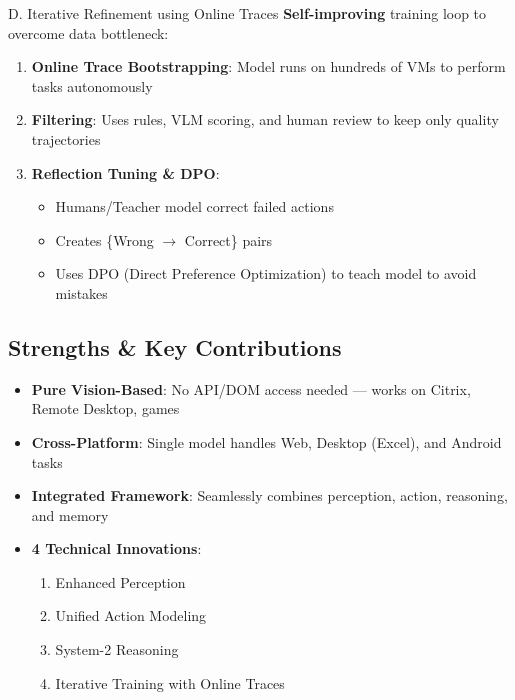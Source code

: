 \begin{frame}{D. Iterative Refinement using Online Traces}
  \textbf{Self-improving} training loop to overcome data bottleneck:
  \begin{enumerate}
    \item \textbf{Online Trace Bootstrapping}: Model runs on hundreds of VMs to perform tasks autonomously
    \item \textbf{Filtering}: Uses rules, VLM scoring, and human review to keep only quality trajectories
    \item \textbf{Reflection Tuning \& DPO}:
      \begin{itemize}
        \item Humans/Teacher model correct failed actions
        \item Creates \{Wrong $\rightarrow$ Correct\} pairs
        \item Uses DPO (Direct Preference Optimization) to teach model to avoid mistakes
      \end{itemize}
  \end{enumerate}
\end{frame}

\subsection{Strengths \& Key Contributions}
\begin{frame}{\insertsubsection}
  \begin{itemize}
    \item \textbf{Pure Vision-Based}: No API/DOM access needed — works on Citrix, Remote Desktop, games
    \item \textbf{Cross-Platform}: Single model handles Web, Desktop (Excel), and Android tasks
    \item \textbf{Integrated Framework}: Seamlessly combines perception, action, reasoning, and memory
    \item \textbf{4 Technical Innovations}:
      \begin{enumerate}
        \item Enhanced Perception
        \item Unified Action Modeling
        \item System-2 Reasoning
        \item Iterative Training with Online Traces
      \end{enumerate}
  \end{itemize}
\end{frame}

